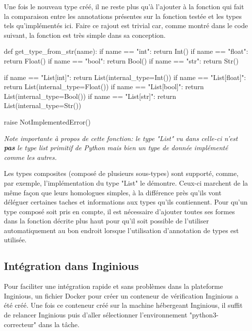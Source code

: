 \documentclass[a4paper]{report}
\begin{document}
Une fois le nouveau type créé, il ne reste plus qu'à l'ajouter à la fonction qui fait la comparaison entre les annotations présentes sur la fonction testée et les types tels qu'implémentés ici.
Faire ce rajout est trivial car, comme montré dans le code suivant, la fonction est très simple dans sa conception.

\begin{python}
def get_type_from_str(name):
    if name == "int":
        return Int()
    if name == "float":
        return Float()
    if name == "bool":
        return Bool()
    if name == "str":
        return Str()

    if name == "List[int]":
        return List(internal_type=Int())
    if name == "List[float]":
        return List(internal_type=Float())
    if name == "List[bool]":
        return List(internal_type=Bool())
    if name == "List[str]":
        return List(internal_type=Str())

    raise NotImplementedError()
\end{python}

\textit{Note importante à propos de cette fonction: le type "List" vu dans celle-ci n'est \textbf{pas} le type list primitif de Python mais bien un type de donnée implémenté comme les autres.}

Les types composites (composé de plusieurs sous-types) sont supporté, comme, par exemple, l'implémentation du type "List" le démontre.
Ceux-ci marchent de la même façon que leurs homologues simples, à la différence près qu'ils vont déléguer certaines taches et informations aux types qu'ils contiennent.
Pour qu'un type composé soit pris en compte, il est nécessaire d'ajouter toutes ses formes dans la fonction décrite plus haut pour qu'il soit possible de l'utiliser automatiquement au bon endroit lorsque l'utilisation d'annotation de types est utilisée.




\subsection{Intégration dans Inginious}

Pour faciliter une intégration rapide et sans problèmes dans la plateforme Inginious, un fichier Docker pour créer un conteneur de vérification Inginious a été créé.
Une fois ce conteneur créé sur la machine hébergeant Inginious, il suffit de relancer Inginious puis d'aller sélectionner l'environnement "python3-correcteur" dans la tâche.
\end{document}
